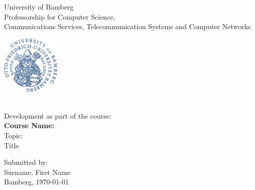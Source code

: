 \begin{titlepage}
  \centering
    \begin{minipage}[t]{16cm}
      \hfill
      \begin{minipage}{12cm}
        \centering
        University of Bamberg
        \\[12pt]
        {\Large Professorship for Computer Science,
        \\
        Communications Services, Telecommunication Systems
        and Computer Networks}
      \end{minipage}
      \hfill
      \begin{minipage}{3cm}
        \includegraphics[height=28mm]{images/ubamlogo.png} %
      \end{minipage}
    \end{minipage}\\[108pt]%
    {\LARGE Development as part of the course:}
    \\[36pt]
    {\LARGE\bf Course Name:}\\[80pt]
    {\LARGE Topic:}\\[36pt]
    {\Huge Title}\\
    \vfill
    \begin{minipage}{\textwidth}
      \center
      Submitted by:\\
      {\Large Surname, First Name\\[18pt]}
      Bamberg, \today
    \end{minipage}
  \end{titlepage}
